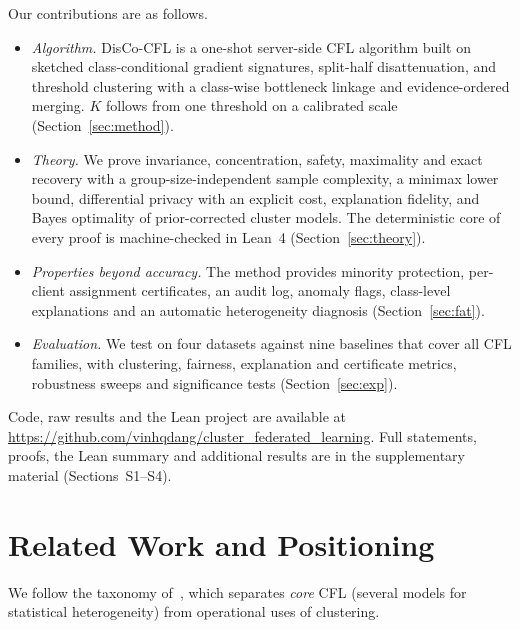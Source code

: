 \documentclass[journal]{IEEEtran}
\theoremstyle{definition}
\newif\ifanon
\begin{document}
Our contributions are as follows.
\begin{itemize}
\item \emph{Algorithm.} DisCo-CFL is a one-shot server-side CFL algorithm built on sketched class-conditional gradient signatures, split-half disattenuation, and threshold clustering with a class-wise bottleneck linkage and evidence-ordered merging. $K$ follows from one threshold on a calibrated scale (Section~\ref{sec:method}).
\item \emph{Theory.} We prove invariance, concentration, safety, maximality and exact recovery with a group-size-independent sample complexity, a minimax lower bound, differential privacy with an explicit cost, explanation fidelity, and Bayes optimality of prior-corrected cluster models. The deterministic core of every proof is machine-checked in Lean~4 (Section~\ref{sec:theory}).
\item \emph{Properties beyond accuracy.} The method provides minority protection, per-client assignment certificates, an audit log, anomaly flags, class-level explanations and an automatic heterogeneity diagnosis (Section~\ref{sec:fat}).
\item \emph{Evaluation.} We test on four datasets against nine baselines that cover all CFL families, with clustering, fairness, explanation and certificate metrics, robustness sweeps and significance tests (Section~\ref{sec:exp}).
\end{itemize}
Code, raw results and the Lean project \ifanon will be made public upon acceptance\else are available at \url{https://github.com/vinhqdang/cluster_federated_learning}\fi. Full statements, proofs, the Lean summary and additional results are in the supplementary material (Sections~S1--S4).

\section{Related Work and Positioning}\label{sec:related}
We follow the taxonomy of~\cite{benali2026survey}, which separates \emph{core} CFL (several models for statistical heterogeneity) from operational uses of clustering.
\end{document}
